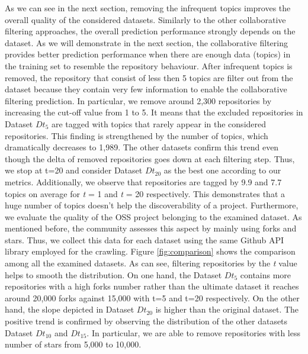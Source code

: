 As we can see in the next section, removing the infrequent topics improves the overall quality of the considered datasets. 
Similarly to the other collaborative filtering approaches, the overall prediction performance strongly depends on the dataset. As we will demonstrate in the next section, the collaborative filtering provides better prediction performance when there are enough data (\ie topics) in the training set to resemble the repository behaviour. After infrequent topics is removed, the repository that consist of less then 5 topics are filter out from the dataset because they contain very few information to enable the collaborative filtering prediction. In particular, we remove around 2,300 repositories by increasing the cut-off value from 1 to 5. It means that the excluded repositories in Dataset $Dt_5$ are tagged with topics that rarely appear in the considered repositories. This finding is strengthened by the number of topics, which dramatically decreases to 1,989. The other datasets confirm this trend even though the delta of removed repositories goes down at each filtering step. Thus, we stop at t=20 and consider Dataset $Dt_{20}$ as the best one according to our metrics. Additionally, we observe that repositories are tagged by 9.9 and 7.7 topics on average for \emph{t} = 1 and \emph{t} = 20 respectively. This demonstrates that a huge number of topics doesn't help the discoverability of a project. 
Furthermore, we evaluate the quality of the OSS project belonging to the examined dataset. As mentioned before, the \GH community assesses this aspect by mainly using forks and stars. Thus, we collect this data for each dataset using the same Github API library employed for the crawling. Figure \ref{fig:comparison} shows the comparison among all the examined datasets. As can see, filtering repositories by the \emph{t} value helps to smooth the distribution. On one hand, the Dataset $Dt_5$ contains more repositories with a high forks number rather than the ultimate dataset \ie it reaches around 20,000 forks against 15,000 with t=5 and t=20 respectively. On the other hand, the slope depicted in Dataset $Dt_{20}$ is higher than the original dataset. The positive trend is confirmed by observing the distribution of the other datasets \ie Dataset $Dt_{10}$ and $Dt_{15}$. In particular, we are able to remove repositories with less number of stars \ie from 5,000 to 10,000. 
